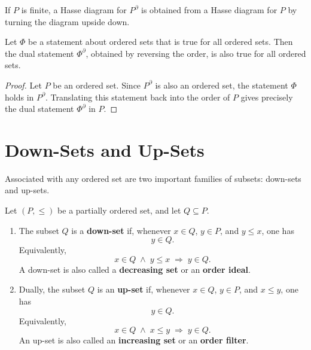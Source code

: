\begin{remark}
If $P$ is finite, a Hasse diagram for $P^{\partial}$ is obtained from a Hasse diagram for $P$ by turning the diagram upside down.
\end{remark}


\begin{proposition}
Let $\Phi$ be a statement about ordered sets that is true for all ordered sets. Then the dual statement $\Phi^{\partial}$, obtained by reversing the order, is also true for all ordered sets.
\end{proposition}

\begin{proof}
Let $P$ be an ordered set. Since $P^{\partial}$ is also an ordered set, the statement $\Phi$ holds in $P^{\partial}$. Translating this statement back into the order of $P$ gives precisely the dual statement $\Phi^{\partial}$ in $P$.
\end{proof}


\section{Down-Sets and Up-Sets}

Associated with any ordered set are two important families of subsets: down-sets and up-sets.


\begin{definition}
Let $(P,\le)$ be a partially ordered set, and let $Q \subseteq P$.

\begin{enumerate}
    \item The subset $Q$ is a \textbf{down-set} if, whenever $x \in Q$, $y \in P$, and $y \le x$, one has
    \[
    y \in Q.
    \]
    Equivalently,
    \[
    x \in Q \;\land\; y \le x
    \;\Longrightarrow\;
    y \in Q.
    \]
    A down-set is also called a \textbf{decreasing set} or an \textbf{order ideal}.

    \item Dually, the subset $Q$ is an \textbf{up-set} if, whenever $x \in Q$, $y \in P$, and $x \le y$, one has
    \[
    y \in Q.
    \]
    Equivalently,
    \[
    x \in Q \;\land\; x \le y
    \;\Longrightarrow\;
    y \in Q.
    \]
    An up-set is also called an \textbf{increasing set} or an \textbf{order filter}.
\end{enumerate}
\end{definition}
